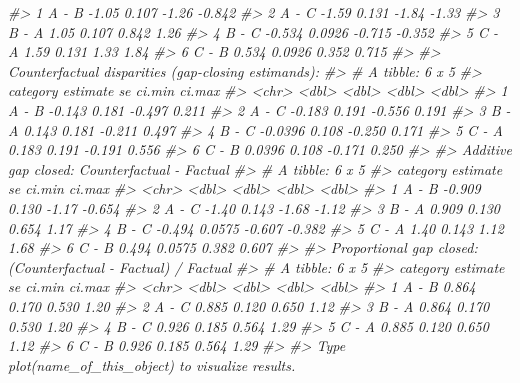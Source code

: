 \documentclass[
]{article}
\newenvironment{Shaded}{\begin{snugshade}}{\end{snugshade}}
\newcommand{\CommentTok}[1]{\textcolor[rgb]{0.56,0.35,0.01}{\textit{#1}}}
\begin{document}
\begin{Shaded}
\begin{Highlighting}[]
\CommentTok{\#\textgreater{} 1 A {-} B      {-}1.05  0.107  {-}1.26  {-}0.842}
\CommentTok{\#\textgreater{} 2 A {-} C      {-}1.59  0.131  {-}1.84  {-}1.33 }
\CommentTok{\#\textgreater{} 3 B {-} A       1.05  0.107   0.842  1.26 }
\CommentTok{\#\textgreater{} 4 B {-} C      {-}0.534 0.0926 {-}0.715 {-}0.352}
\CommentTok{\#\textgreater{} 5 C {-} A       1.59  0.131   1.33   1.84 }
\CommentTok{\#\textgreater{} 6 C {-} B       0.534 0.0926  0.352  0.715}
\CommentTok{\#\textgreater{} }
\CommentTok{\#\textgreater{} Counterfactual disparities (gap{-}closing estimands):}
\CommentTok{\#\textgreater{} \# A tibble: 6 x 5}
\CommentTok{\#\textgreater{}   category estimate    se ci.min ci.max}
\CommentTok{\#\textgreater{}   \textless{}chr\textgreater{}       \textless{}dbl\textgreater{} \textless{}dbl\textgreater{}  \textless{}dbl\textgreater{}  \textless{}dbl\textgreater{}}
\CommentTok{\#\textgreater{} 1 A {-} B     {-}0.143  0.181 {-}0.497  0.211}
\CommentTok{\#\textgreater{} 2 A {-} C     {-}0.183  0.191 {-}0.556  0.191}
\CommentTok{\#\textgreater{} 3 B {-} A      0.143  0.181 {-}0.211  0.497}
\CommentTok{\#\textgreater{} 4 B {-} C     {-}0.0396 0.108 {-}0.250  0.171}
\CommentTok{\#\textgreater{} 5 C {-} A      0.183  0.191 {-}0.191  0.556}
\CommentTok{\#\textgreater{} 6 C {-} B      0.0396 0.108 {-}0.171  0.250}
\CommentTok{\#\textgreater{} }
\CommentTok{\#\textgreater{} Additive gap closed: Counterfactual {-} Factual}
\CommentTok{\#\textgreater{} \# A tibble: 6 x 5}
\CommentTok{\#\textgreater{}   category estimate     se ci.min ci.max}
\CommentTok{\#\textgreater{}   \textless{}chr\textgreater{}       \textless{}dbl\textgreater{}  \textless{}dbl\textgreater{}  \textless{}dbl\textgreater{}  \textless{}dbl\textgreater{}}
\CommentTok{\#\textgreater{} 1 A {-} B      {-}0.909 0.130  {-}1.17  {-}0.654}
\CommentTok{\#\textgreater{} 2 A {-} C      {-}1.40  0.143  {-}1.68  {-}1.12 }
\CommentTok{\#\textgreater{} 3 B {-} A       0.909 0.130   0.654  1.17 }
\CommentTok{\#\textgreater{} 4 B {-} C      {-}0.494 0.0575 {-}0.607 {-}0.382}
\CommentTok{\#\textgreater{} 5 C {-} A       1.40  0.143   1.12   1.68 }
\CommentTok{\#\textgreater{} 6 C {-} B       0.494 0.0575  0.382  0.607}
\CommentTok{\#\textgreater{} }
\CommentTok{\#\textgreater{} Proportional gap closed: (Counterfactual {-} Factual) / Factual}
\CommentTok{\#\textgreater{} \# A tibble: 6 x 5}
\CommentTok{\#\textgreater{}   category estimate    se ci.min ci.max}
\CommentTok{\#\textgreater{}   \textless{}chr\textgreater{}       \textless{}dbl\textgreater{} \textless{}dbl\textgreater{}  \textless{}dbl\textgreater{}  \textless{}dbl\textgreater{}}
\CommentTok{\#\textgreater{} 1 A {-} B       0.864 0.170  0.530   1.20}
\CommentTok{\#\textgreater{} 2 A {-} C       0.885 0.120  0.650   1.12}
\CommentTok{\#\textgreater{} 3 B {-} A       0.864 0.170  0.530   1.20}
\CommentTok{\#\textgreater{} 4 B {-} C       0.926 0.185  0.564   1.29}
\CommentTok{\#\textgreater{} 5 C {-} A       0.885 0.120  0.650   1.12}
\CommentTok{\#\textgreater{} 6 C {-} B       0.926 0.185  0.564   1.29}
\CommentTok{\#\textgreater{} }
\CommentTok{\#\textgreater{} Type plot(name\_of\_this\_object) to visualize results.}
\end{Highlighting}
\end{Shaded}
\end{document}
